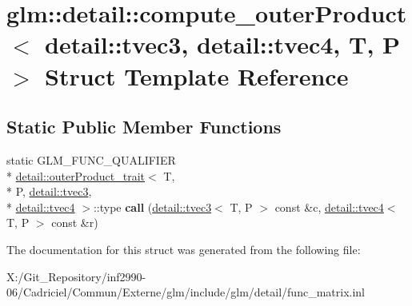 \hypertarget{structglm_1_1detail_1_1compute__outer_product_3_01detail_1_1tvec3_00_01detail_1_1tvec4_00_01_t_00_01_p_01_4}{\section{glm\-:\-:detail\-:\-:compute\-\_\-outer\-Product$<$ detail\-:\-:tvec3, detail\-:\-:tvec4, T, P $>$ Struct Template Reference}
\label{structglm_1_1detail_1_1compute__outer_product_3_01detail_1_1tvec3_00_01detail_1_1tvec4_00_01_t_00_01_p_01_4}
}
\subsection*{Static Public Member Functions}
\begin{DoxyCompactItemize}
\item 
\hypertarget{structglm_1_1detail_1_1compute__outer_product_3_01detail_1_1tvec3_00_01detail_1_1tvec4_00_01_t_00_01_p_01_4_a449658ffb9f411b13c9942e68b9ad60b}{static G\-L\-M\-\_\-\-F\-U\-N\-C\-\_\-\-Q\-U\-A\-L\-I\-F\-I\-E\-R \\*
\hyperlink{structglm_1_1detail_1_1outer_product__trait}{detail\-::outer\-Product\-\_\-trait}$<$ T, \\*
P, \hyperlink{structglm_1_1detail_1_1tvec3}{detail\-::tvec3}, \\*
\hyperlink{structglm_1_1detail_1_1tvec4}{detail\-::tvec4} $>$\-::type {\bfseries call} (\hyperlink{structglm_1_1detail_1_1tvec3}{detail\-::tvec3}$<$ T, P $>$ const \&c, \hyperlink{structglm_1_1detail_1_1tvec4}{detail\-::tvec4}$<$ T, P $>$ const \&r)}\label{structglm_1_1detail_1_1compute__outer_product_3_01detail_1_1tvec3_00_01detail_1_1tvec4_00_01_t_00_01_p_01_4_a449658ffb9f411b13c9942e68b9ad60b}

\end{DoxyCompactItemize}


The documentation for this struct was generated from the following file\-:\begin{DoxyCompactItemize}
\item 
X\-:/\-Git\-\_\-\-Repository/inf2990-\/06/\-Cadriciel/\-Commun/\-Externe/glm/include/glm/detail/func\-\_\-matrix.\-inl\end{DoxyCompactItemize}
